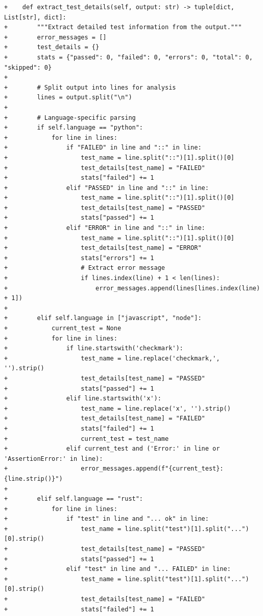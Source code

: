 \documentclass{article}
\begin{document}
\begin{lstlisting}[style=diffstyle]
+    def extract_test_details(self, output: str) -> tuple[dict, List[str], dict]:
+        """Extract detailed test information from the output."""
+        error_messages = []
+        test_details = {}
+        stats = {"passed": 0, "failed": 0, "errors": 0, "total": 0, "skipped": 0}
+
+        # Split output into lines for analysis
+        lines = output.split("\n")
+        
+        # Language-specific parsing
+        if self.language == "python":
+            for line in lines:
+                if "FAILED" in line and "::" in line:
+                    test_name = line.split("::")[1].split()[0]
+                    test_details[test_name] = "FAILED"
+                    stats["failed"] += 1
+                elif "PASSED" in line and "::" in line:
+                    test_name = line.split("::")[1].split()[0]
+                    test_details[test_name] = "PASSED"
+                    stats["passed"] += 1
+                elif "ERROR" in line and "::" in line:
+                    test_name = line.split("::")[1].split()[0]
+                    test_details[test_name] = "ERROR"
+                    stats["errors"] += 1
+                    # Extract error message
+                    if lines.index(line) + 1 < len(lines):
+                        error_messages.append(lines[lines.index(line) + 1])
+        
+        elif self.language in ["javascript", "node"]:
+            current_test = None
+            for line in lines:
+                if line.startswith('checkmark'):
+                    test_name = line.replace('checkmark,', '').strip()
+                    test_details[test_name] = "PASSED"
+                    stats["passed"] += 1
+                elif line.startswith('x'):
+                    test_name = line.replace('x', '').strip()
+                    test_details[test_name] = "FAILED"
+                    stats["failed"] += 1
+                    current_test = test_name
+                elif current_test and ('Error:' in line or 'AssertionError:' in line):
+                    error_messages.append(f"{current_test}: {line.strip()}")
+
+        elif self.language == "rust":
+            for line in lines:
+                if "test" in line and "... ok" in line:
+                    test_name = line.split("test")[1].split("...")[0].strip()
+                    test_details[test_name] = "PASSED"
+                    stats["passed"] += 1
+                elif "test" in line and "... FAILED" in line:
+                    test_name = line.split("test")[1].split("...")[0].strip()
+                    test_details[test_name] = "FAILED"
+                    stats["failed"] += 1

\end{lstlisting}
\end{document}
